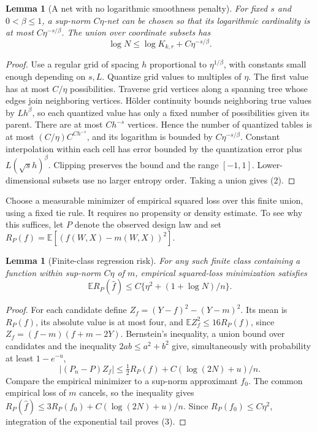 \documentclass[11pt,a4paper]{article}
\newtheorem{lemma}[theorem]{Lemma}
\newcommand{\E}{\mathbb E}
\begin{document}
\begin{lemma}[A net with no logarithmic smoothness penalty]
For fixed $s$ and $0<\beta\le1$, a sup-norm $C\eta$-net can be chosen so that its logarithmic cardinality is at most $C\eta^{-s/\beta}$. The union over coordinate subsets has
\[
 \log N\le\log K_{k,r}+C\eta^{-s/\beta}. \tag{2}
\]
\end{lemma}
\begin{proof}
Use a regular grid of spacing $h$ proportional to $\eta^{1/\beta}$, with constants small enough depending on $s,L$. Quantize grid values to multiples of $\eta$. The first value has at most $C/\eta$ possibilities. Traverse grid vertices along a spanning tree whose edges join neighboring vertices. H\"older continuity bounds neighboring true values by $Lh^\beta$, so each quantized value has only a fixed number of possibilities given its parent. There are at most $Ch^{-s}$ vertices. Hence the number of quantized tables is at most $(C/\eta)C^{Ch^{-s}}$, and its logarithm is bounded by $C\eta^{-s/\beta}$. Constant interpolation within each cell has error bounded by the quantization error plus $L(\sqrt{s}h)^\beta$. Clipping preserves the bound and the range $[-1,1]$. Lower-dimensional subsets use no larger entropy order. Taking a union gives (2).
\end{proof}

Choose a measurable minimizer of empirical squared loss over this finite union, using a fixed tie rule. It requires no propensity or density estimate. To see why this suffices, let $P$ denote the observed design law and set $R_P(f)=\E[(f(W,X)-m(W,X))^2]$.

\begin{lemma}[Finite-class regression risk]
For any such finite class containing a function within sup-norm $C\eta$ of $m$, empirical squared-loss minimization satisfies
\[
 \E R_P(\widehat f)\le C\{\eta^2+(1+\log N)/n\}. \tag{3}
\]
\end{lemma}
\begin{proof}
For each candidate define $Z_f=(Y-f)^2-(Y-m)^2$. Its mean is $R_P(f)$, its absolute value is at most four, and $\E Z_f^2\le16R_P(f)$, since $Z_f=(f-m)(f+m-2Y)$. Bernstein's inequality, a union bound over candidates and the inequality $2ab\le a^2+b^2$ give, simultaneously with probability at least $1-e^{-u}$,
\[
 |(P_n-P)Z_f|\le\tfrac12R_P(f)+C(\log(2N)+u)/n.
\]
Compare the empirical minimizer to a sup-norm approximant $f_0$. The common empirical loss of $m$ cancels, so the inequality gives $R_P(\widehat f)\le3R_P(f_0)+C(\log(2N)+u)/n$. Since $R_P(f_0)\le C\eta^2$, integration of the exponential tail proves (3).
\end{proof}
\end{document}
